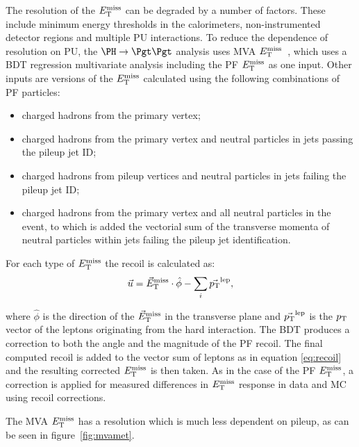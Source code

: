The resolution of the $E_{\mathrm{T}}^{\text{miss}}$ can be degraded by a number of factors. These include minimum energy thresholds
in the calorimeters, non-instrumented detector regions and multiple \ac{PU}
interactions. To reduce the dependence of resolution on \ac{PU}, the $\PH\to\Pgt\Pgt$
analysis uses MVA $E_{\mathrm{T}}^{\text{miss}}$~\cite{CMS-PAS-JME-12-002}, 
which uses a \ac{BDT} regression multivariate analysis
including the \ac{PF} $E_{\mathrm{T}}^{\text{miss}}$ as one input. Other inputs are versions of the
$E_{\mathrm{T}}^{\text{miss}}$ calculated using the following combinations of \ac{PF} particles: 
\begin{itemize}
\item charged hadrons from the primary vertex;
\item charged hadrons from the primary vertex and neutral particles in jets
passing the pileup jet ID;
\item charged hadrons from pileup vertices and neutral particles in jets failing
the pileup jet ID;
\item charged hadrons from the primary vertex and all neutral particles in the
event, to which is added the vectorial sum of the transverse momenta of neutral
particles within jets failing the pileup jet identification.
\end{itemize}

For each type of $E_{\mathrm{T}}^{\text{miss}}$ the recoil is calculated as:
\begin{equation}
\vec{u} = \vec E_\mathrm{T}^\mathrm{miss} \cdot \hat{\phi} - \sum_{i}{\vec{p_{\mathrm{T}}}^{\text{lep}}} ,
\label{eq:recoil}
\end{equation}

where $\hat{\phi}$ is the direction of the $\vec E_\mathrm{T}^\mathrm{miss}$ in the transverse plane and
$\vec{p_{\mathrm{T}}}^{\text{lep}}$ is the $p_{\mathrm{T}}$ vector of the leptons originating from the
hard interaction. The \ac{BDT} produces a correction to both the angle and the
magnitude of the \ac{PF} recoil. The final computed recoil is added to the
vector sum of leptons as in equation \ref{eq:recoil} and the resulting corrected
$E_{\mathrm{T}}^{\text{miss}}$ is then taken. As in the case of the \ac{PF} $E_{\mathrm{T}}^{\text{miss}}$, a correction is
applied for measured differences in $E_{\mathrm{T}}^{\text{miss}}$ response in data and \ac{MC} using
recoil corrections.

The MVA $E_{\mathrm{T}}^{\text{miss}}$ has a resolution which is much less
dependent on pileup, as can be seen in figure~\ref{fig:mvamet}.

